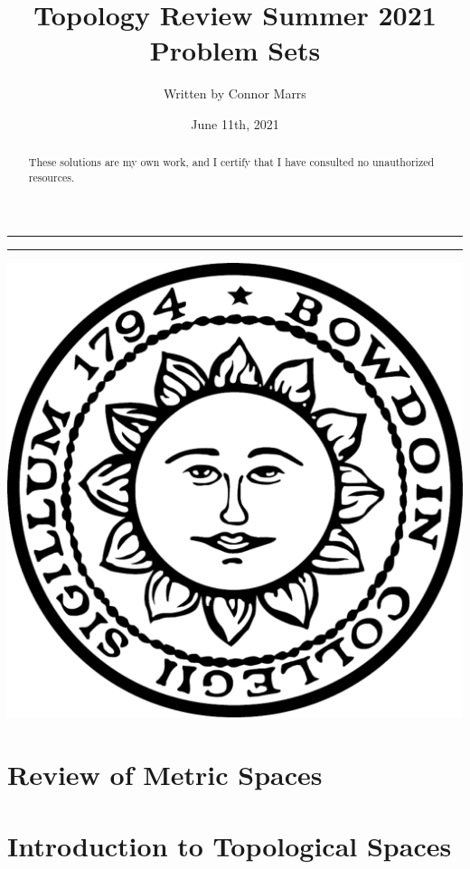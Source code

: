 \documentclass{article}
\title{Topology Review Summer 2021\\Problem Sets}
\date{June 11th, 2021}
\author{Written by Connor Marrs}
\newcommand{\<}{\langle}
\renewcommand{\>}{\rangle}
\theoremstyle{definition}
\begin{document}
\begin{titlepage}
\maketitle
\noindent\rule{\textwidth}{1pt}
\begin{abstract}
    These solutions are my own work, and I certify that I have consulted no unauthorized resources.
\end{abstract} 
\noindent\rule{\textwidth}{1pt}

\begin{center}
    \includegraphics[scale = 0.15]{../images/Bowdoin_Seal.png}
\end{center}

\end{titlepage}


\maketitle

\section{Review of Metric Spaces}


\newpage
\section{Introduction to Topological Spaces}

\end{document}
